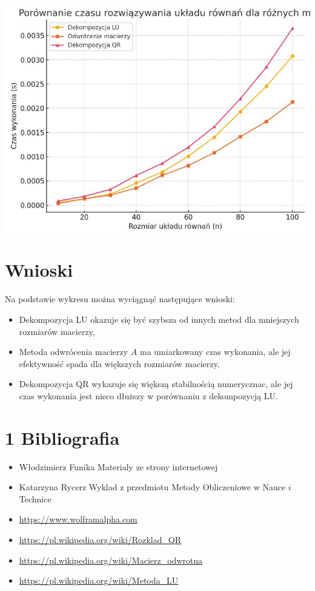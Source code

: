 \documentclass[10pt]{article}
\begin{document}
\begin{center}
\includegraphics[max width=\textwidth]{2024_05_12_58df1b62820eb2f3d9ceg-5}
\end{center}

\section*{Wnioski}
Na podstawie wykresu można wyciągnąć następujące wnioski:

\begin{itemize}
  \item Dekompozycja LU okazuje się być szybsza od innych metod dla mniejszych rozmiarów macierzy,
  \item Metoda odwrócenia macierzy $A$ ma umiarkowany czas wykonania, ale jej efektywność spada dla większych rozmiarów macierzy,
  \item Dekompozycja QR wykazuje się większą stabilnością numerycznac, ale jej czas wykonania jest nieco dłuższy w porównaniu z dekompozycją LU.
\end{itemize}

\section*{1 Bibliografia}
\begin{itemize}
  \item Włodzimierz Funika Materialy ze strony internetowej
  \item Katarzyna Rycerz Wyklad z przedmiotu Metody Obliczeniowe w Nauce $i$ Technice
  \item \href{https://www.wolframalpha.com}{https://www.wolframalpha.com}
  \item \href{https://pl.wikipedia.org/wiki/Rozklad_QR}{https://pl.wikipedia.org/wiki/Rozklad\_QR}
  \item \href{https://pl.wikipedia.org/wiki/Macierz_odwrotna}{https://pl.wikipedia.org/wiki/Macierz\_odwrotna}
  \item \href{https://pl.wikipedia.org/wiki/Metoda_LU}{https://pl.wikipedia.org/wiki/Metoda\_LU}
\end{itemize}
\end{document}
